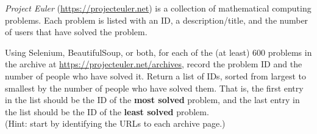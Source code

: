 \begin{problem}
\emph{Project Euler} (\url{https://projecteuler.net}) is a collection of mathematical computing problems.
Each problem is listed with an ID, a description/title, and the number of users that have solved the problem.

Using Selenium, BeautifulSoup, or both, for each of the (at least) 600 problems in the archive at \url{https://projecteuler.net/archives}, record the problem ID and the number of people who have solved it.
Return a list of IDs, sorted from largest to smallest by the number of people who have solved them.
That is, the first entry in the list should be the ID of the \textbf{most solved} problem, and the last entry in the list should be the ID of the \textbf{least solved} problem.
\\(Hint: start by identifying the URLs to each archive page.)
\end{problem}
